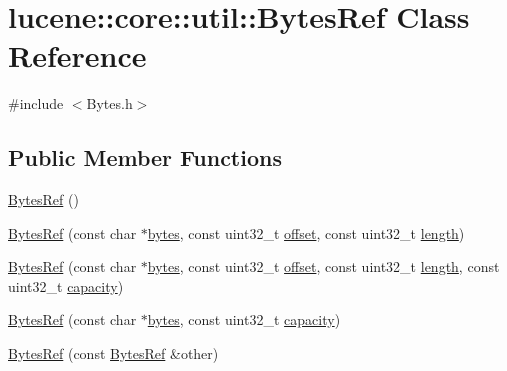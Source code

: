 \hypertarget{classlucene_1_1core_1_1util_1_1BytesRef}{}\section{lucene\+:\+:core\+:\+:util\+:\+:Bytes\+Ref Class Reference}
\label{classlucene_1_1core_1_1util_1_1BytesRef}


{\ttfamily \#include $<$Bytes.\+h$>$}

\subsection*{Public Member Functions}
\begin{DoxyCompactItemize}
\item 
\mbox{\hyperlink{classlucene_1_1core_1_1util_1_1BytesRef_a5c352a399671a6ed5e04cd334149b662}{Bytes\+Ref}} ()
\item 
\mbox{\hyperlink{classlucene_1_1core_1_1util_1_1BytesRef_aafacc8aec4dc0494f42d91876b64bb17}{Bytes\+Ref}} (const char $\ast$\mbox{\hyperlink{classlucene_1_1core_1_1util_1_1BytesRef_a50b260da81b7f31687ac167ff52c9a1c}{bytes}}, const uint32\+\_\+t \mbox{\hyperlink{classlucene_1_1core_1_1util_1_1BytesRef_a00b5e81a37602c7af1fde636cd44f12b}{offset}}, const uint32\+\_\+t \mbox{\hyperlink{classlucene_1_1core_1_1util_1_1BytesRef_a198e62928759942ffc9d2c3ff877b4e4}{length}})
\item 
\mbox{\hyperlink{classlucene_1_1core_1_1util_1_1BytesRef_a3cb2618be430384290cd84c488f8b07d}{Bytes\+Ref}} (const char $\ast$\mbox{\hyperlink{classlucene_1_1core_1_1util_1_1BytesRef_a50b260da81b7f31687ac167ff52c9a1c}{bytes}}, const uint32\+\_\+t \mbox{\hyperlink{classlucene_1_1core_1_1util_1_1BytesRef_a00b5e81a37602c7af1fde636cd44f12b}{offset}}, const uint32\+\_\+t \mbox{\hyperlink{classlucene_1_1core_1_1util_1_1BytesRef_a198e62928759942ffc9d2c3ff877b4e4}{length}}, const uint32\+\_\+t \mbox{\hyperlink{classlucene_1_1core_1_1util_1_1BytesRef_a9e1775d26ac1dec137aa57fae87f654c}{capacity}})
\item 
\mbox{\hyperlink{classlucene_1_1core_1_1util_1_1BytesRef_aad74198593bb0663f505c2751940b68b}{Bytes\+Ref}} (const char $\ast$\mbox{\hyperlink{classlucene_1_1core_1_1util_1_1BytesRef_a50b260da81b7f31687ac167ff52c9a1c}{bytes}}, const uint32\+\_\+t \mbox{\hyperlink{classlucene_1_1core_1_1util_1_1BytesRef_a9e1775d26ac1dec137aa57fae87f654c}{capacity}})
\item 
\mbox{\hyperlink{classlucene_1_1core_1_1util_1_1BytesRef_a88c7864495cbe868a1939a2e2a7953de}{Bytes\+Ref}} (const \mbox{\hyperlink{classlucene_1_1core_1_1util_1_1BytesRef}{Bytes\+Ref}} \&other)

\end{DoxyCompactItemize}
